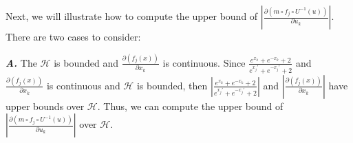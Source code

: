 Next, we will illustrate how to compute the upper bound of ${\left| {\frac{{\partial (m \circ {f_j} \circ {U^{ - 1}}(u))}}{{\partial {u_k}}}} \right|}$. There are two cases to consider:

\textbf{\emph{A.}} The $\mathcal{H}$ is bounded and ${\frac{{\partial ({f_j}(x))}}{{\partial {x_k}}}}$ is continuous. Since ${\frac{{{e^{{x_k}}} + {e^{ - {x_k}}} + 2}}{{{e^{{x_{j}'}}} + {e^{ - {x_{j}'}}} + 2}}}$ and ${\frac{{\partial ({f_j}(x))}}{{\partial {x_k}}}}$ is continuous and $\mathcal{H}$ is bounded, then $\left| {\frac{{{e^{{x_k}}} + {e^{ - {x_k}}} + 2}}{{{e^{{x_{j}'}}} + {e^{ - {x_{j}'}}} + 2}}} \right|$ and $\left| {\frac{{\partial ({f_j}(x))}}{{\partial {x_k}}}} \right|$ have upper bounds over $\mathcal{H}$. Thus, we can compute the upper bound of ${\left| {\frac{{\partial (m \circ {f_j} \circ {U^{ - 1}}(u))}}{{\partial {u_k}}}} \right|}$ over $\mathcal{H}$.


